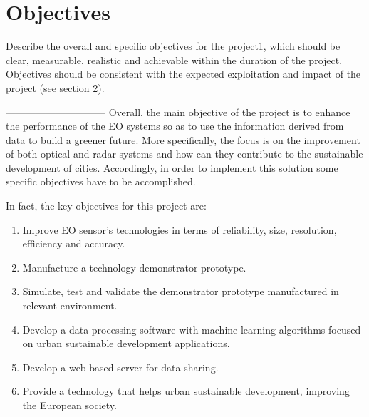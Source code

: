 \section{Objectives}

Describe the overall and specific objectives for the project1, which should be clear, measurable, realistic and achievable within the duration of the project. Objectives should be consistent with the expected exploitation and impact of the project (see section 2). 

------------------------------
Overall, the main objective of the project is to enhance the performance of the
EO systems so as to use the information derived from data to build a greener future. More
specifically, the focus is on the improvement of both optical and radar systems and how can
they contribute to the sustainable development of cities. Accordingly, in order to implement this solution some specific objectives have to be accomplished.

In fact, the key objectives for this project are:

\begin{enumerate}

	\item Improve EO sensor's technologies in terms of reliability, size, resolution, efficiency and accuracy.

	\item Manufacture a technology demonstrator prototype.

	\item Simulate, test and validate the demonstrator prototype manufactured in relevant environment.

	\item Develop a data processing software with machine learning algorithms focused on urban sustainable development applications. 

	\item Develop a web based server for data sharing. 

	\item Provide a technology that helps urban sustainable development, improving the European society.
 
\end{enumerate}